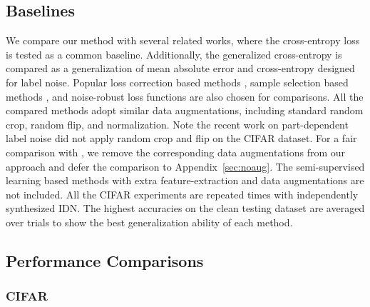 \documentclass[final]{cvpr}
\newcommand{\rev}[1]{{\color{blue}#1}}
\newcommand{\rev}[1]{#1}
\begin{document}
\subsection{Baselines}
We compare our method with several related works, where the cross-entropy loss is tested as a common baseline.
Additionally, the generalized cross-entropy \cite{zhang2018generalized} is compared as a generalization of mean absolute error and cross-entropy designed for label noise.
Popular loss correction based methods \cite{patrini2017making,xia2020parts,xia2019anchor}, sample selection based methods \cite{sieve2020,han2018co,wei2020combating,yu2019does}, and noise-robust loss functions \cite{liu2019peer,xu2019l_dmi} are also chosen for comparisons.
All the compared methods adopt similar data augmentations, including standard random crop, random flip, and normalization.
Note the recent work on part-dependent label noise \cite{xia2020parts} did not apply random crop and flip on the CIFAR dataset.
For a fair comparison with \cite{xia2020parts}, we remove the corresponding data augmentations from our approach and defer the comparison to Appendix~\ref{sec:noaug}.
The semi-supervised learning based methods with extra feature-extraction and data augmentations are not included.
\rev{All the CIFAR experiments are repeated  times with independently synthesized IDN.}
The highest accuracies on the clean testing dataset are \rev{averaged over  trials to show the best generalization ability of each method.}




\subsection{Performance Comparisons}
\subsubsection{CIFAR}
\end{document}
